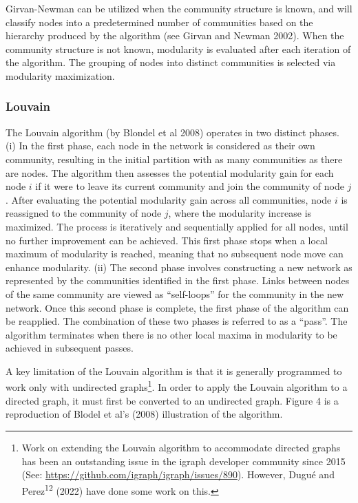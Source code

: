 \documentclass{article}
\begin{document}
Girvan-Newman can be utilized when the community structure is known, and will
classify nodes into a predetermined number of communities based on the
hierarchy produced by the algorithm (see Girvan and Newman 2002). When
the community structure is not known, modularity is evaluated after
each iteration of the algorithm. The grouping of nodes into distinct
communities is selected via modularity maximization.

\subsubsection{Louvain}\label{louvain}

The Louvain algorithm (by Blondel et al 2008) operates in two distinct
phases. (i) In the first phase, each node in the network is considered
as their own community, resulting in the initial partition with as many
communities as there are nodes. The algorithm then assesses the
potential modularity gain for each node \(i\) if it were to leave its
current community and join the community of node \(j\). After evaluating
the potential modularity gain across all communities, node \(i\) is
reassigned to the community of node \(j\), where the modularity increase
is maximized. The process is iteratively and sequentially applied for
all nodes, until no further improvement can be achieved. This first phase
stops when a local maximum of modularity is reached, meaning that no
subsequent node move can enhance modularity. (ii) The second phase
involves constructing a new network as represented by the communities identified
in the first phase. Links between nodes of the same community are viewed
as ``self-loops'' for the community in the new network. Once this
second phase is complete, the first phase of the algorithm can be
reapplied. The combination of these two phases is referred to as a
``pass''. The algorithm terminates when there is no other local maxima
in modularity to be achieved in subsequent passes.

A key limitation of the Louvain algorithm is that it is generally
programmed to work only with undirected graphs\footnote{Work on
  extending the Louvain algorithm to accommodate directed graphs has
  been an outstanding issue in the igraph developer community since 2015 (See:
  \url{https://github.com/igraph/igraph/issues/890}). However, Dugué and
  Perez\textsuperscript{12} (2022) have done some work on this.}. In
order to apply the Louvain algorithm to a directed graph, it must first
be converted to an undirected graph. Figure 4 is a reproduction of
Blodel et al's (2008) illustration of the algorithm.
\end{document}
